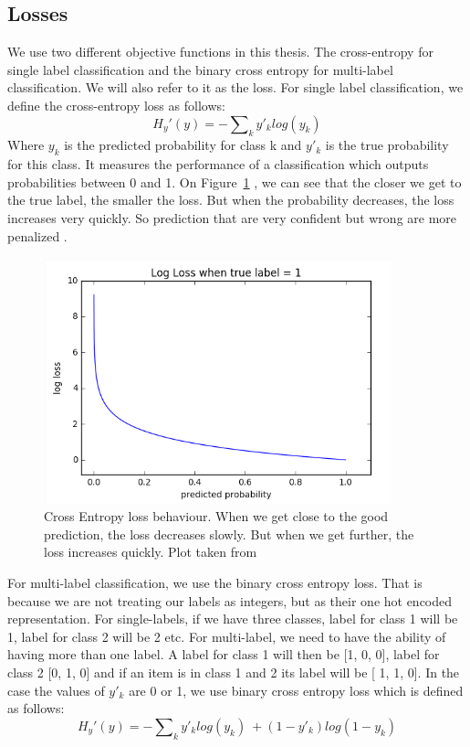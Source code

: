 \subsection{Losses} \label{sec:loss}
We use two different objective functions in this thesis. The cross-entropy for single label classification and the binary cross entropy for multi-label classification. We will also refer to it as the loss. 
For single label classification, we define the cross-entropy loss as follows: \[H_y'(y) = - \sum\nolimits_k y'_k log(y_k)\] Where \(y_k\) is the predicted probability for class k and \(y'_k\) is the true probability for this class. It measures the performance of a classification which outputs probabilities between 0 and 1. On  Figure~\ref{fig:CE} , we can see that the closer we get to the true label, the smaller the loss. But when the probability decreases, the loss increases very quickly. So prediction that are very confident but wrong are more penalized \cite{nnbook}.
\begin{figure}[!htp]
    \centering
        \includegraphics[width=0.9\textwidth]{figures/02-cross_entropy}
        \caption[Cross Entropy loss behaviour]{Cross Entropy loss behaviour. When we get close to the good prediction, the loss decreases slowly. But when we get further, the loss increases quickly. Plot taken from \cite{celoss}}
        \label{fig:CE}
\end{figure}


For multi-label classification, we use the binary cross entropy loss. That is because we are not treating our labels as integers, but as their one hot encoded representation. For single-labels, if we have three classes, label for class 1 will be 1, label for class 2 will be 2 etc.  For multi-label, we need to have the ability of having more than one label. A label for class 1 will then be [1, 0, 0], label for class 2 [0, 1, 0] and if an item is in class 1 and 2 its label will be [ 1, 1, 0]. In the case the values of \(y'_k\) are 0 or 1, we use binary cross entropy loss which is defined as follows: \[H_y'(y) = - \sum\nolimits_k y'_k log(y_k)\ + (1 - y'_k)log(1 - y_k) \]

